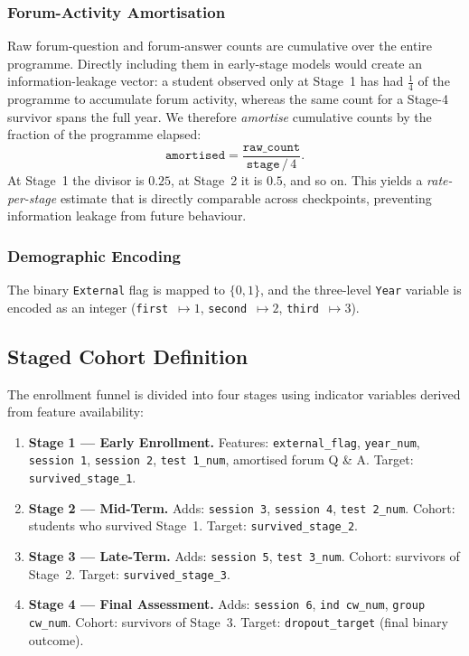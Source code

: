 \documentclass[8pt,twocolumn]{extarticle}
\begin{document}
\subsubsection{Forum-Activity Amortisation}
Raw forum-question and forum-answer counts are cumulative over the entire programme.
Directly including them in early-stage models would create an information-leakage vector:
a student observed only at Stage~1 has had $\tfrac{1}{4}$ of the programme to accumulate
forum activity, whereas the same count for a Stage-4 survivor spans the full year.
We therefore \emph{amortise} cumulative counts by the fraction of the programme elapsed:
\[
  \texttt{amortised} = \frac{\texttt{raw\_count}}{\texttt{stage} \,/\, 4}.
\]
At Stage~1 the divisor is $0.25$, at Stage~2 it is $0.5$, and so on.
This yields a \emph{rate-per-stage} estimate that is directly comparable across
checkpoints, preventing information leakage from future behaviour.

\subsubsection{Demographic Encoding}
The binary \texttt{External} flag is mapped to $\{0, 1\}$, and the three-level
\texttt{Year} variable is encoded as an integer (\texttt{first}~$\mapsto 1$,
\texttt{second}~$\mapsto 2$, \texttt{third}~$\mapsto 3$).

\subsection{Staged Cohort Definition}\label{subsec:stages}

The enrollment funnel is divided into four stages using indicator variables
derived from feature availability:

\begin{enumerate}
  \item \textbf{Stage 1 --- Early Enrollment.}
        Features: \texttt{external\_flag}, \texttt{year\_num},
        \texttt{session 1}, \texttt{session 2}, \texttt{test 1\_num},
        amortised forum Q \& A.
        Target: \texttt{survived\_stage\_1}.

  \item \textbf{Stage 2 --- Mid-Term.}
        Adds: \texttt{session 3}, \texttt{session 4}, \texttt{test 2\_num}.
        Cohort: students who survived Stage~1.
        Target: \texttt{survived\_stage\_2}.

  \item \textbf{Stage 3 --- Late-Term.}
        Adds: \texttt{session 5}, \texttt{test 3\_num}.
        Cohort: survivors of Stage~2.
        Target: \texttt{survived\_stage\_3}.

  \item \textbf{Stage 4 --- Final Assessment.}
        Adds: \texttt{session 6}, \texttt{ind cw\_num}, \texttt{group cw\_num}.
        Cohort: survivors of Stage~3.
        Target: \texttt{dropout\_target} (final binary outcome).
\end{enumerate}
\end{document}

